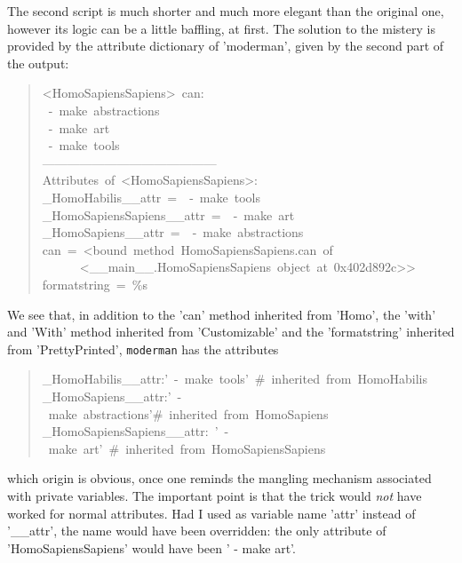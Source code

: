 \documentclass[10pt,english]{article}
\begin{document}
The second script is much shorter and much more elegant than the original
one, however its logic can be a little baffling, at first. The solution
to the mistery is provided by the attribute dictionary of 'moderman',
given by the second part of the output:
\begin{quote}
\begin{ttfamily}\begin{flushleft}
\mbox{<HomoSapiensSapiens>~can:}\\
\mbox{~-~make~abstractions~~}\\
\mbox{~-~make~art~~}\\
\mbox{~-~make~tools~}\\
\mbox{------------------------------------------}\\
\mbox{Attributes~of~<HomoSapiensSapiens>:}\\
\mbox{{\_}HomoHabilis{\_}{\_}attr~=~~-~make~tools}\\
\mbox{{\_}HomoSapiensSapiens{\_}{\_}attr~=~~-~make~art}\\
\mbox{{\_}HomoSapiens{\_}{\_}attr~=~~-~make~abstractions}\\
\mbox{can~=~<bound~method~HomoSapiensSapiens.can~of~}\\
\mbox{~~~~~~<{\_}{\_}main{\_}{\_}.HomoSapiensSapiens~object~at~0x402d892c>>}\\
\mbox{formatstring~=~{\%}s}
\end{flushleft}\end{ttfamily}
\end{quote}

We see that, in addition to the 'can' method inherited from 'Homo',
the 'with' and 'With' method inherited from 'Customizable' and
the 'formatstring' inherited from 'PrettyPrinted', 
\texttt{moderman} has the attributes
\begin{quote}
\begin{ttfamily}\begin{flushleft}
\mbox{{\_}HomoHabilis{\_}{\_}attr:'~-~make~tools'~{\#}~inherited~from~HomoHabilis}\\
\mbox{{\_}HomoSapiens{\_}{\_}attr:'~-~make~abstractions'{\#}~inherited~from~HomoSapiens}\\
\mbox{{\_}HomoSapiensSapiens{\_}{\_}attr:~'~-~make~art'~{\#}~inherited~from~HomoSapiensSapiens}
\end{flushleft}\end{ttfamily}
\end{quote}

which origin is obvious, once one reminds the mangling mechanism associated
with private variables. The important point is that the trick would \emph{not}
have worked for normal attributes. Had I used as variable name
'attr' instead of '{\_}{\_}attr', the name would have been overridden: the only
attribute of 'HomoSapiensSapiens' would have been ' - make art'.
\end{document}

